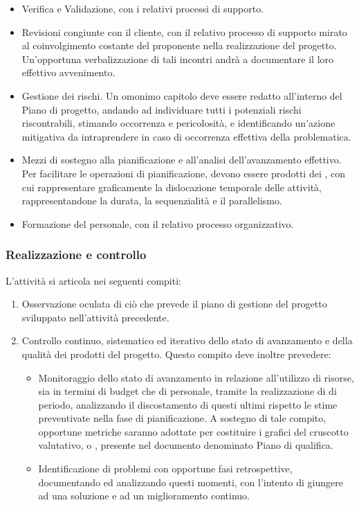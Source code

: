 \begin{enumerate}
\begin{itemize}
        \item Verifica e Validazione, con i relativi processi di supporto.
        \item Revisioni congiunte con il cliente, con il relativo processo di supporto mirato al coinvolgimento costante del proponente nella realizzazione del progetto. Un'opportuna verbalizzazione di tali incontri andrà a documentare il loro effettivo avvenimento.
        \item Gestione dei rischi. Un omonimo capitolo deve essere redatto all'interno del Piano di progetto, andando ad individuare tutti i potenziali rischi riscontrabili, stimando occorrenza e pericolosità, e identificando un'azione mitigativa da intraprendere in caso di occorrenza effettiva della problematica.
        \item Mezzi di sostegno alla pianificazione e all'analisi dell'avanzamento effettivo. Per facilitare le operazioni di pianificazione, devono essere prodotti dei , con cui rappresentare graficamente la dislocazione temporale delle attività, rappresentandone la durata, la sequenzialità e il parallelismo.
        \item Formazione del personale, con il relativo processo organizzativo.
    \end{itemize}
\end{enumerate}

\subsubsection{Realizzazione e controllo}
L'attività si articola nei seguenti compiti:
\begin{enumerate}
    \item Osservazione oculata di ciò che prevede il piano di gestione del progetto sviluppato nell'attività precedente.
    \item Controllo continuo, sistematico ed iterativo dello stato di avanzamento e della qualità dei prodotti del progetto. Questo compito deve inoltre prevedere:
    \begin{itemize}
        \item Monitoraggio dello stato di avanzamento in relazione all'utilizzo di risorse, sia in termini di budget che di personale, tramite la realizzazione di  di periodo, analizzando il discostamento di questi ultimi rispetto le stime preventivate nella fase di pianificazione. A sostegno di tale compito, opportune metriche saranno adottate per costituire i grafici del cruscotto valutativo, o , presente nel documento denominato Piano di qualifica.
        \item Identificazione di problemi con opportune fasi retrospettive, documentando ed analizzando questi momenti, con l'intento di giungere ad una soluzione e ad un miglioramento continuo.
    \end{itemize}
\end{enumerate}

